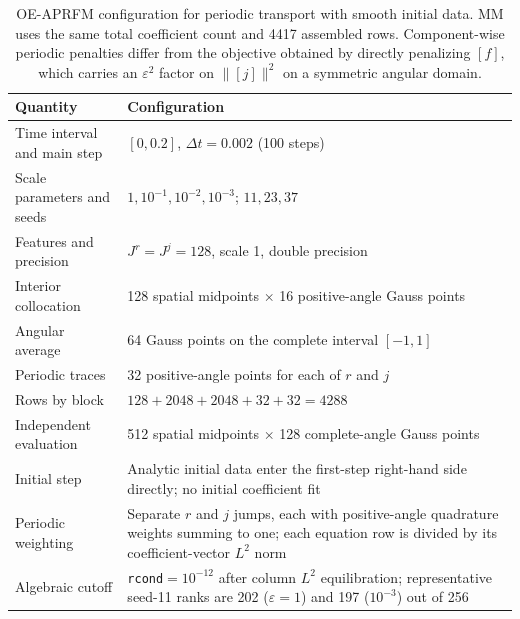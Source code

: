 \begin{table}[!htb]
\centering\small
\setlength{\tabcolsep}{6pt}
\caption{OE-APRFM configuration for periodic transport with smooth initial data. MM uses the same total coefficient count and 4417 assembled rows. Component-wise periodic penalties differ from the objective obtained by directly penalizing $[f]$, which carries an $\varepsilon^2$ factor on $\|[j]\|^2$ on a symmetric angular domain.}
\label{tab:transient-config}
\begin{tabular}{@{}p{.32\linewidth}p{.63\linewidth}@{}}
\toprule
Quantity & Configuration\\
\midrule
Time interval and main step & $[0,0.2]$, $\Delta t=0.002$ (100 steps)\\
Scale parameters and seeds & $1,10^{-1},10^{-2},10^{-3}$; $11,23,37$\\
Features and precision & $J^r=J^j=128$, scale 1, double precision\\
Interior collocation & 128 spatial midpoints $\times$ 16 positive-angle Gauss points\\
Angular average & 64 Gauss points on the complete interval $[-1,1]$\\
Periodic traces & 32 positive-angle points for each of $r$ and $j$\\
Rows by block & $128+2048+2048+32+32=4288$\\
Independent evaluation & 512 spatial midpoints $\times$ 128 complete-angle Gauss points\\
Initial step & Analytic initial data enter the first-step right-hand side directly; no initial coefficient fit\\
Periodic weighting & Separate $r$ and $j$ jumps, each with positive-angle quadrature weights summing to one; each equation row is divided by its coefficient-vector $L^2$ norm\\
Algebraic cutoff & \texttt{rcond}$=10^{-12}$ after column $L^2$ equilibration; representative seed-11 ranks are 202 ($\varepsilon=1$) and 197 ($10^{-3}$) out of 256\\
\bottomrule
\end{tabular}
\end{table}

